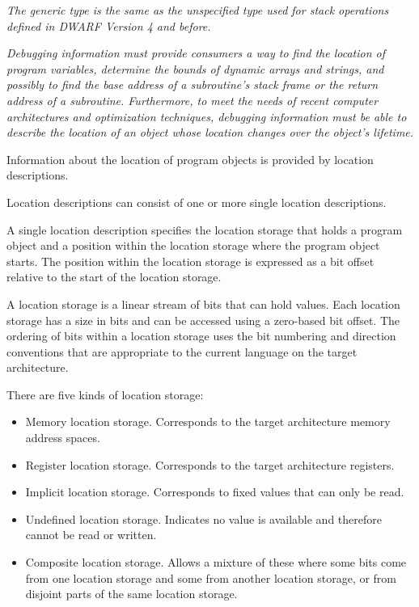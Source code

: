\textit{The generic type is the same as the unspecified type used for
stack operations defined in DWARF Version 4 and before.}

\textit{Debugging information must provide consumers a way to
find the location of program variables, determine the bounds of dynamic
arrays and strings, and possibly to find the base address of a
subroutine’s stack frame or the return address of a subroutine.
Furthermore, to meet the needs of recent computer architectures and
optimization techniques, debugging information must be able to describe
the location of an object whose location changes over the object’s
lifetime.}

Information about the location of program objects is provided by
location descriptions.

Location descriptions can consist of one or more single location
descriptions.

A single location description specifies the location storage that holds
a program object and a position within the location storage where the
program object starts. The position within the location storage is
expressed as a bit offset relative to the start of the location storage.

A location storage is a linear stream of bits that can hold values. Each
location storage has a size in bits and can be accessed using a
zero-based bit offset. The ordering of bits within a location storage
uses the bit numbering and direction conventions that are appropriate to
the current language on the target architecture.

There are five kinds of location storage:

\begin{itemize}
\item Memory location storage. Corresponds to the target architecture
memory address spaces.
\item Register location storage. Corresponds to the target
architecture registers.
\item Implicit location storage. Corresponds to fixed values that can
only be read.
\item Undefined location storage. Indicates no value is available and
therefore cannot be read or written.

\item Composite location storage. Allows a mixture of these where some
bits come from one location storage and some from another location
storage, or from disjoint parts of the same location storage.
\end{itemize}

